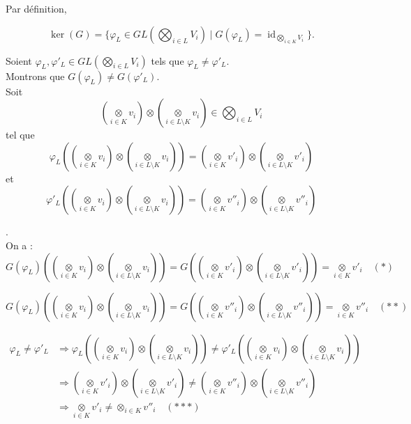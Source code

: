 \documentclass[a4paper, 14pt]{report}
\begin{document}
\begin{onehalfspace}
{			Par définition,
			
			\[
			\ker(G) = \{ \varphi_{L} \in GL(\bigotimes_{i\in L} V_i) \mid G(\varphi_{L}) = \operatorname{id}_{\bigotimes_{i\in K} V_i} \}.
			\]
			
			Soient \(  \varphi_{L} , \varphi{'}_{L} \in GL(\bigotimes_{i\in L} V_i) \) tels que \( \varphi_{L} \neq \varphi{'}_{L} \).\\
			Montrons que \( G(\varphi_{L}) \neq G(\varphi{'}_{L})\).\\
			
			Soit 
			\[  (\underset{i\in K}\otimes v_i) \otimes(\underset{i\in L\setminus K}\otimes v_i) \in \bigotimes_{i\in L} V_i \]
			tel que \\
			
			\[
			\varphi_{L}( (\underset{i\in K}\otimes v_i) \otimes(\underset{i\in L\setminus K}\otimes v_i)) =  (\underset{i\in K}\otimes v{'}_i) \otimes(\underset{i\in L\setminus K}\otimes v{'}_i)
			\]
			et \\
			
			\[
			\varphi{'}_{L}( (\underset{i\in K}\otimes v_i) \otimes(\underset{i\in L\setminus K}\otimes v_i)) =  (\underset{i\in K}\otimes v{''}_i) \otimes(\underset{i\in L\setminus K}\otimes v{''}_i)
			\]
			
			.\\
			
			On a :
			\[
			G(\varphi_{L}) ((\underset{i\in K}\otimes v_i) \otimes(\underset{i\in L\setminus K}\otimes v_i)) = G((\underset{i\in K}\otimes v{'}_i) \otimes(\underset{i\in L\setminus K}\otimes v{'}_i)) = \underset{i\in K}\otimes v{'}_i \quad (*)
			\]
			
			
			\[
			G(\varphi_{L}) ((\underset{i\in K}\otimes v_i) \otimes(\underset{i\in L\setminus K}\otimes v_i)) = G((\underset{i\in K}\otimes v{''}_i) \otimes(\underset{i\in L\setminus K}\otimes v{''}_i)) = \underset{i\in K}\otimes v{''}_i \quad (**)
			\]
			
			\begin{align*}
				\varphi_{L} \neq \varphi'_{L}  
				&\Longrightarrow  
				\varphi_{L} (( \underset{i\in K}\otimes v_i) \otimes(\underset{i\in L\setminus K}\otimes v_i )) \neq 
				\varphi'_{L} (( \underset{i\in K}\otimes v_i) \otimes(\underset{i\in L\setminus K}\otimes v_i )) \\
				&\Longrightarrow  
				(\underset{i\in K}\otimes v{'}_i) \otimes(\underset{i\in L\setminus K}\otimes v{'}_i) \neq 
				(\underset{i\in K}\otimes v{''}_i) \otimes(\underset{i\in L\setminus K}\otimes v{''}_i) \\
				&\Longrightarrow  
				\underset{i\in K}\otimes v{'}_i \neq \otimes_{i\in K} v''_{i}   \quad (***)
			\end{align*}
			
}
\end{onehalfspace}
\end{document}
